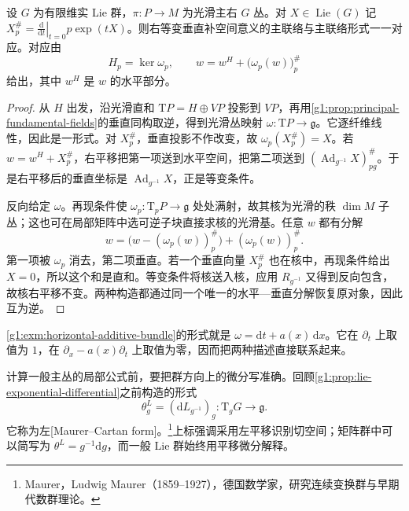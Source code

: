 \begin{theorem}\label{g1:thm:principal-connection-equivalence}
	设 \(G\) 为有限维实 Lie 群，\(\pi:P\to M\) 为光滑主右 \(G\) 丛。对 \(X\in\operatorname{Lie}(G)\) 记 \(X_p^\#=\left.\frac{\mathrm{d}}{\mathrm{d}t}\right|_{t=0}p\exp(tX)\)。则右等变垂直补空间意义的主联络与主联络形式一一对应。对应由
	\[
		H_p=\ker\omega_p,\qquad
		w=w^H+\bigl(\omega_p(w)\bigr)_p^\#
	\]
	给出，其中 \(w^H\) 是 \(w\) 的水平部分。
\end{theorem}
\begin{proof}
	从 \(H\) 出发，沿光滑直和 \(\mathrm{T}P=H\oplus VP\) 投影到 \(VP\)，再用\cref{g1:prop:principal-fundamental-fields}的垂直同构取逆，得到光滑丛映射 \(\omega:\mathrm{T}P\to\mathfrak g\)。它逐纤维线性，因此是一形式。对 \(X_p^\#\)，垂直投影不作改变，故 \(\omega_p(X_p^\#)=X\)。若 \(w=w^H+X_p^\#\)，右平移把第一项送到水平空间，把第二项送到 \((\operatorname{Ad}_{g^{-1}}X)_{pg}^\#\)。于是右平移后的垂直坐标是 \(\operatorname{Ad}_{g^{-1}}X\)，正是等变条件。

	反向给定 \(\omega\)。再现条件使 \(\omega_p:\mathrm{T}_pP\to\mathfrak g\) 处处满射，故其核为光滑的秩 \(\dim M\) 子丛；这也可在局部矩阵中选可逆子块直接求核的光滑基。任意 \(w\) 都有分解
	\[
		w=\bigl(w-(\omega_p(w))_p^\#\bigr)+(\omega_p(w))_p^\#.
	\]
	第一项被 \(\omega_p\) 消去，第二项垂直。若一个垂直向量 \(X_p^\#\) 也在核中，再现条件给出 \(X=0\)，所以这个和是直和。等变条件将核送入核，应用 \(R_{g^{-1}}\) 又得到反向包含，故核右平移不变。两种构造都通过同一个唯一的水平—垂直分解恢复原对象，因此互为逆。
\end{proof}

\cref{g1:exm:horizontal-additive-bundle}的形式就是 \(\omega=\mathrm{d}t+a(x)\,\mathrm{d}x\)。它在 \(\partial_t\) 上取值为 \(1\)，在 \(\partial_x-a(x)\partial_t\) 上取值为零，因而把两种描述直接联系起来。

\ProseParagraphBreak

计算一般主丛的局部公式前，要把群方向上的微分写准确。回顾\cref{g1:prop:lie-exponential-differential}之前构造的形式
\[
	\theta_g^L=(\mathrm{d}L_{g^{-1}})_g:\mathrm{T}_gG\longrightarrow\mathfrak g.
\]
它称为左[Maurer--Cartan form]。\footnote{Maurer，Ludwig Maurer（1859--1927），德国数学家，研究连续变换群与早期代数群理论。}上标强调采用左平移识别切空间；矩阵群中可以简写为 \(\theta^L=g^{-1}\mathrm{d}g\)，而一般 Lie 群始终用平移微分解释。

